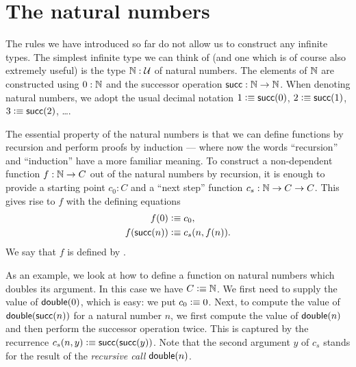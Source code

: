%


\section{The natural numbers}
\label{sec:inductive-types}

%
%
%
The rules we have introduced so far do not allow us to construct any infinite types.
The simplest infinite type we can think of (and one which is of course also extremely useful) is the type $\mathbb{N} : \mathcal{U}$ of natural numbers.
The elements of $\mathbb{N}$ are constructed using $0 : \mathbb{N}$ and the successor operation $\mathsf{succ} : \mathbb{N} \to \mathbb{N}$.
When denoting natural numbers, we adopt the usual decimal notation $1 \vcentcolon\equiv \mathsf{succ}(0)$, $2 \vcentcolon\equiv \mathsf{succ}(1)$, $3 \vcentcolon\equiv \mathsf{succ}(2)$, \dots.

The essential property of the natural numbers is that we can define functions by recursion and perform proofs by induction --- where now the words ``recursion'' and ``induction'' have a more familiar meaning.
%
To construct a non-dependent function $f : \mathbb{N} \to C$ out of the natural numbers by recursion, it is enough to provide a starting point $c_0 : C$ and a ``next step'' function $c_s : \mathbb{N} \to C \to C$.
This gives rise to $f$ with the defining equations
\begin{align*}
  f(0) &\vcentcolon\equiv c_0, \\
  f(\mathsf{succ}(n)) &\vcentcolon\equiv c_s(n,f(n)).
\end{align*}
We say that $f$ is defined by .
%
%

As an example, we look at how to define a function on natural numbers which doubles its argument.
In this case we have $C\vcentcolon\equiv \mathbb{N}$.
We first need to supply the value of $\mathsf{double}(0)$, which is easy: we put $c_0 \vcentcolon\equiv 0$.
Next, to compute the value of $\mathsf{double}(\mathsf{succ}(n))$ for a natural number $n$, we first compute the value of $\mathsf{double}(n)$ and then perform the successor operation twice.
This is captured by the recurrence $c_s(n,y) \vcentcolon\equiv \mathsf{succ}(\mathsf{succ}(y))$.
Note that the second argument $y$ of $c_s$ stands for the result of the \emph{recursive call} $\mathsf{double}(n)$.


